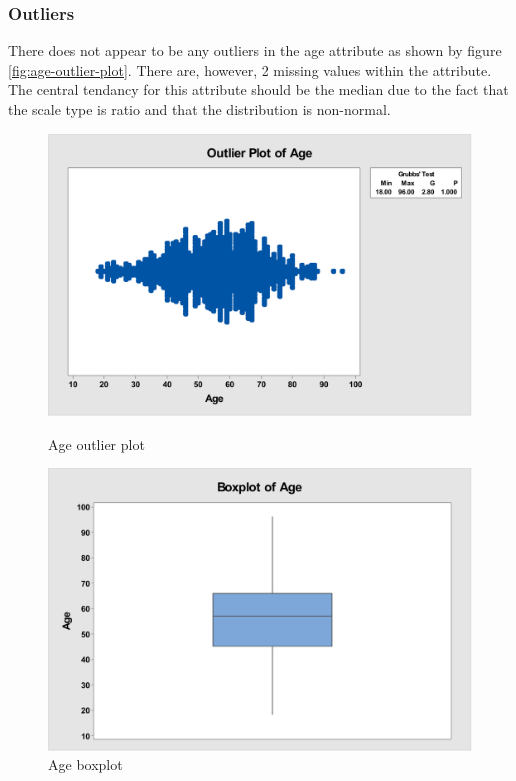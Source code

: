 \documentclass[12pt]{article}
\begin{document}
      \subsubsection{Outliers}
        There does not appear to be any outliers in the age attribute as shown by figure \ref{fig:age-outlier-plot}. There are, however, 2 missing values within the attribute. The central tendancy for this attribute should be the median due to the fact that the scale type is ratio and that the distribution is non-normal.

        \begin{figure}[H]
          \centering
          \begin{minipage}[b]{0.45\textwidth}
            \includegraphics[width=\textwidth]{age-outlier-plot}
            \caption{Age outlier plot}
            \label{fig:age-outlier-plot}
          \end{minipage}
          \hfill
          \begin{minipage}[b]{0.45\textwidth}
            \includegraphics[width=\textwidth]{age-boxplot}
            \caption{Age boxplot}
            \label{fig:age-boxplot}
          \end{minipage}
        \end{figure}
\end{document}
